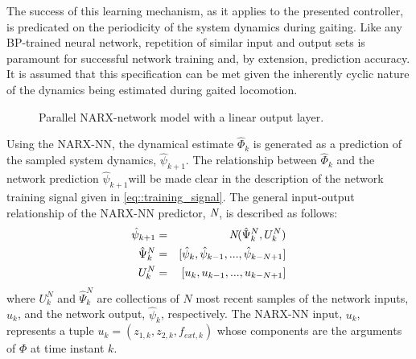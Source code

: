 The success of this learning mechanism, as it applies to the presented controller, is predicated on the periodicity of the system dynamics during gaiting. Like any BP-trained neural network, repetition of similar input and output sets is paramount for successful network training and, by extension, prediction accuracy. It is assumed that this specification can be met given the inherently cyclic nature of the dynamics being estimated during gaited locomotion. 
				\begin{figure}[t!]
					\centering
					\caption{Parallel NARX-network model with a linear output layer.}
					\label{fig::narx_net}
				\end{figure}
			Using the NARX-NN, the dynamical estimate $\hat{\Phi}_{k}$ is generated as a prediction of the sampled system dynamics, $\hat{\psi}_{k+1}$. The relationship between $\hat{\Phi}_{k}$ and the network prediction $\hat{\psi}_{k+1}$will be made clear in the description of the network training signal given in \ref{eq::training_signal}. The general input-output relationship of the NARX-NN predictor, $\emph{N}$, is described as follows:
				\begin{eqnarray}
					\hat{\psi}_{k+1}	&=& \emph{N}(\hat{\Psi}_{k}^{N},{U}_{k}^{N}) \nonumber\\
					\hat{\Psi}_{k}^{N}	&=& [\hat{\psi}_{k},\hat{\psi}_{k-1},...,\hat{\psi}_{k-N+1}]  \nonumber\\
					{U}_{k}^{N}		&=& [u_{k}   ,u_{k-1}   ,...,u_{k-N+1}   ]
					\label{eq::narx_model}
				\end{eqnarray}
			where ${U}_{k}^{N}$  and $\hat{\Psi}_{k}^{N}$ are collections of $N$ most recent samples of the network inputs, $u_{k}$, and the network output, $\hat{\psi}_{k}$, respectively. The NARX-NN input, $u_{k}$, represents a tuple $u_{k} = (z_{1,k}, z_{2,k}, f_{ext,k})$ whose components are the arguments of $\Phi$ at time instant $k$. 



